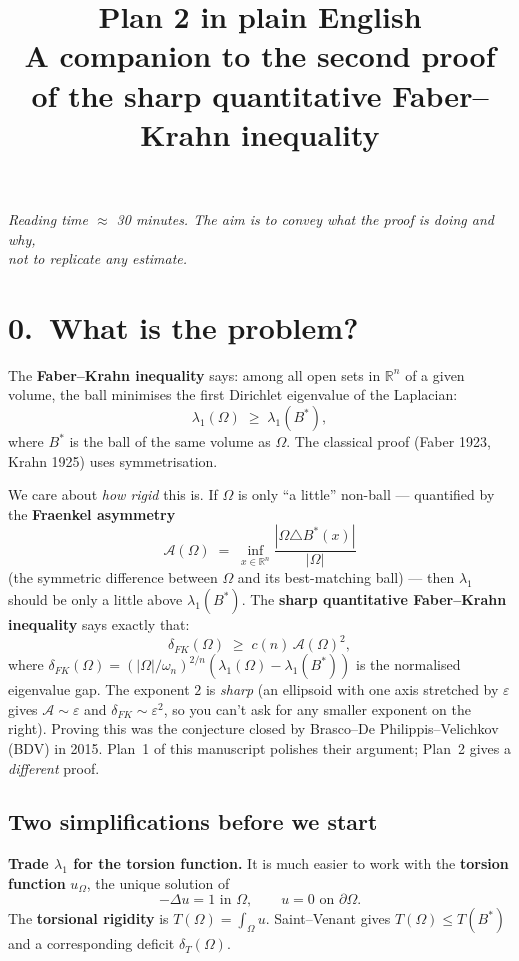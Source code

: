 \documentclass[11pt,a4paper]{article}
\title{\textbf{Plan 2 in plain English}\\[2pt]
\large A companion to the second proof of the sharp quantitative Faber--Krahn inequality}
\author{}
\date{}
\newcommand{\R}{\mathbb{R}}
\newcommand{\Bstar}{B^{*}}
\newcommand{\Fr}{\mathcal{A}}
\newcommand{\deltaT}{\delta_T}
\newcommand{\deltaFK}{\delta_{FK}}
\begin{document}
\maketitle
\vspace{-2em}

\begin{center}
\emph{Reading time $\approx$ 30 minutes. The aim is to convey what the proof is doing and why,\\
not to replicate any estimate.}
\end{center}

\bigskip

\section*{0.\ What is the problem?}

The \textbf{Faber--Krahn inequality} says: among all open sets in $\R^n$ of a given volume, the ball minimises the first Dirichlet eigenvalue of the Laplacian:
\[
\lambda_1(\Omega) \;\ge\; \lambda_1(\Bstar),
\]
where $\Bstar$ is the ball of the same volume as $\Omega$. The classical proof (Faber 1923, Krahn 1925) uses symmetrisation.

We care about \emph{how rigid} this is. If $\Omega$ is only ``a little'' non-ball --- quantified by the \textbf{Fraenkel asymmetry}
\[
\Fr(\Omega) \;=\; \inf_{x \in \R^n} \frac{|\Omega \triangle \Bstar(x)|}{|\Omega|}
\]
(the symmetric difference between $\Omega$ and its best-matching ball) --- then $\lambda_1$ should be only a little above $\lambda_1(\Bstar)$. The \textbf{sharp quantitative Faber--Krahn inequality} says exactly that:
\[
\deltaFK(\Omega) \;\ge\; c(n)\,\Fr(\Omega)^2,
\]
where $\deltaFK(\Omega) = (|\Omega|/\omega_n)^{2/n}(\lambda_1(\Omega) - \lambda_1(\Bstar))$ is the normalised eigenvalue gap. The exponent $2$ is \emph{sharp} (an ellipsoid with one axis stretched by $\varepsilon$ gives $\Fr \sim \varepsilon$ and $\deltaFK \sim \varepsilon^2$, so you can't ask for any smaller exponent on the right). Proving this was the conjecture closed by Brasco--De Philippis--Velichkov (BDV) in 2015. Plan~1 of this manuscript polishes their argument; Plan~2 gives a \emph{different} proof.

\subsection*{Two simplifications before we start}

\textbf{Trade $\lambda_1$ for the torsion function.} It is much easier to work with the \textbf{torsion function} $u_\Omega$, the unique solution of
\[
-\Delta u = 1 \text{ in } \Omega, \qquad u = 0 \text{ on } \partial \Omega.
\]
The \textbf{torsional rigidity} is $T(\Omega) = \int_\Omega u$. Saint--Venant gives $T(\Omega) \le T(\Bstar)$ and a corresponding deficit $\deltaT(\Omega)$.
\end{document}
